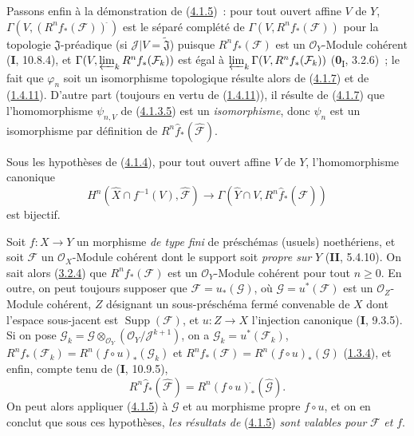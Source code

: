 \begin{env}[4.1.8]
\label{III.4.1.8-fr}
Passons enfin à la démonstration de (\hyperref[III.4.1.5-fr]{4.1.5})~:
pour tout ouvert affine $V$ de $Y$,
$\Gamma(V,(R^nf_*(\mathcal F))^{\widehat{\,}})$ est le séparé complété de
$\Gamma(V,R^nf_*(\mathcal F))$ pour la topologie $\mathfrak J$-préadique
(si $\mathcal J|V=\widetilde{\mathfrak J}$) puisque
$R^nf_*(\mathcal F)$ est un $\mathcal O_Y$-Module cohérent (\textbf{I}, 10.8.4),
et $\Gamma(V,\varprojlim_kR^nf_*(\mathcal F_k))$ est égal à
$\varprojlim_k\Gamma(V,R^nf_*(\mathcal F_k))$
(\textbf{0}\textsubscript{I}, 3.2.6)~; le fait que $\varphi_n$ soit un isomorphisme
topologique résulte alors de (\hyperref[III.4.1.7-fr]{4.1.7}) et de
(\hyperref[III.1.4.11-fr]{1.4.11}). D'autre part (toujours en vertu de
(\hyperref[III.1.4.11-fr]{1.4.11})), il résulte de
(\hyperref[III.4.1.7-fr]{4.1.7}) que l'homomorphisme $\psi_{n,V}$ de
(\hyperref[III.4.1.3.5-fr]{4.1.3.5}) est un \emph{isomorphisme}, donc $\psi_n$
est un isomorphisme par définition de
$R^n\widehat f_*(\widehat{\mathcal F})$.
\end{env}

\begin{corollary}[4.1.9]
\label{III.4.1.9-fr}
Sous les hypothèses de \textup{(\hyperref[III.4.1.4-fr]{4.1.4})}, pour tout ouvert
affine $V$ de $Y$, l'homomorphisme canonique
\[
H^n(\widehat X\cap f^{-1}(V),\widehat{\mathcal F})
\longrightarrow\Gamma(\widehat Y\cap V,
R^n\widehat f_*(\widehat{\mathcal F}))
\]
est bijectif.
\end{corollary}

\begin{remark}[4.1.10]
\label{III.4.1.10-fr}
\upshape
Soit $f:X\to Y$ un morphisme \emph{de type fini} de préschémas (usuels)
noethériens, et soit $\mathcal F$ un $\mathcal O_X$-Module cohérent dont le
support soit \emph{propre sur} $Y$ (\textbf{II}, 5.4.10). On sait alors
(\hyperref[III.3.2.4-fr]{3.2.4}) que $R^nf_*(\mathcal F)$ est un
$\mathcal O_Y$-Module cohérent pour tout $n\geq0$. En outre, on peut
toujours supposer que $\mathcal F=u_*(\mathcal G)$, où
$\mathcal G=u^*(\mathcal F)$ est un $\mathcal O_Z$-Module cohérent, $Z$
désignant un sous-préschéma fermé convenable de $X$ dont l'espace
sous-jacent est $\operatorname{Supp}(\mathcal F)$, et $u:Z\to X$
l'injection canonique (\textbf{I}, 9.3.5). Si on pose
$\mathcal G_k=\mathcal G\otimes_{\mathcal O_Y}
(\mathcal O_Y/\mathcal J^{k+1})$,
on a $\mathcal G_k=u^*(\mathcal F_k)$,
$R^nf_*(\mathcal F_k)=R^n(f\circ u)_*(\mathcal G_k)$ et
$R^nf_*(\mathcal F)=R^n(f\circ u)_*(\mathcal G)$
(\hyperref[III.1.3.4-fr]{1.3.4}), et enfin, compte tenu de (\textbf{I}, 10.9.5),
\[
R^n\widehat f_*(\widehat{\mathcal F})
=R^n(f\circ u)^{\widehat{\,}}_*(\widehat{\mathcal G}).
\]
On peut alors appliquer (\hyperref[III.4.1.5-fr]{4.1.5}) à $\mathcal G$ et
au morphisme propre $f\circ u$, et on en conclut que sous ces hypothèses,
\emph{les résultats de} (\hyperref[III.4.1.5-fr]{4.1.5}) \emph{sont valables pour}
$\mathcal F$ \emph{et} $f$.
\end{remark}

